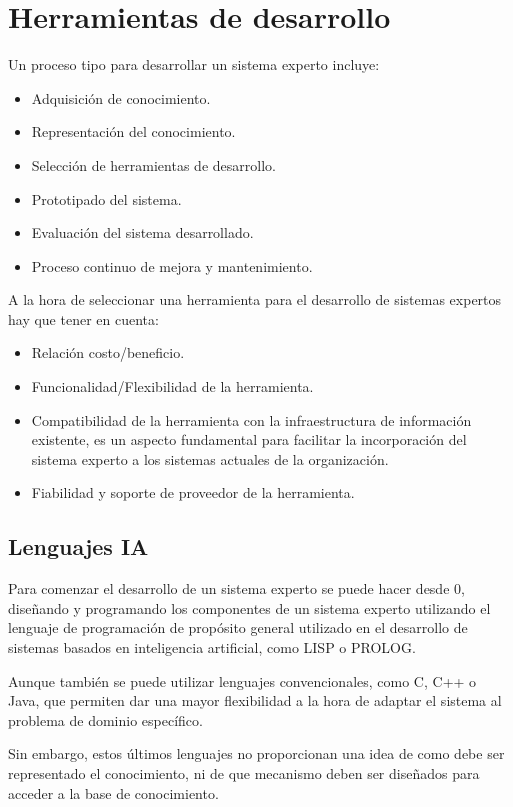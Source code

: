 \documentclass[12pt, twoside, openright]{report} %
\begin{document}
\section{Herramientas de desarrollo}
Un proceso tipo para desarrollar un sistema experto incluye:
 \begin{itemize}
     \item Adquisición de conocimiento.
     \item Representación del conocimiento.
     \item Selección de herramientas de desarrollo.
     \item Prototipado del sistema.
     \item Evaluación del sistema desarrollado.
     \item Proceso continuo de mejora y mantenimiento.
 \end{itemize}
 A la hora de seleccionar una herramienta para el desarrollo de sistemas expertos hay que tener en cuenta:
 \begin{itemize}
     \item Relación costo/beneficio.
     \item Funcionalidad/Flexibilidad de la herramienta.
     \item Compatibilidad de la herramienta con la infraestructura de información existente, es un aspecto fundamental para facilitar la incorporación del sistema experto a los sistemas actuales de la organización.
     \item Fiabilidad y soporte de proveedor de la herramienta.
 \end{itemize}
\subsection{Lenguajes IA}
Para comenzar el desarrollo de un sistema experto se puede hacer desde 0, diseñando y programando los componentes de un sistema experto utilizando el lenguaje de programación de propósito general utilizado en el desarrollo de sistemas basados en inteligencia artificial, como LISP o PROLOG.
 
Aunque también se puede utilizar lenguajes convencionales, como C, C++ o Java, que permiten dar una mayor flexibilidad a la hora de adaptar el sistema al problema de dominio específico. 
 
Sin embargo, estos últimos lenguajes no proporcionan una idea de como debe ser representado el conocimiento, ni de que mecanismo deben ser diseñados para acceder a la base de conocimiento.
 
\end{document}
